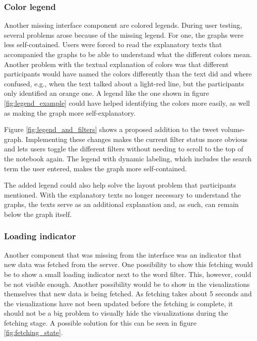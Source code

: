 \subsubsection*{Color legend}
Another missing interface component are colored legends. During user testing, several problems arose because of the missing legend. For one, the graphs were less self-contained. Users were forced to read the explanatory texts that accompanied the graphs to be able to understand what the different colors mean. Another problem with the textual explanation of colors was that different participants would have named the colors differently than the text did and where confused, e.g., when the text talked about a light-red line, but the participants only identified an orange one. A legend like the one shown in figure \ref{fig:legend_example} could have helped identifying the colors more easily, as well as making the graph more self-explanatory.

Figure \ref{fig:legend_and_filters} shows a proposed addition to the tweet volume-graph. Implementing these changes makes the current filter status more obvious and lets users toggle the different filters without needing to scroll to the top of the notebook again. The legend with dynamic labeling, which includes the search term the user entered, makes the graph more self-contained.

The added legend could also help solve the layout problem that participants mentioned. With the explanatory texts no longer necessary to understand the graphs, the texts serve as an additional explanation and, as such, can remain below the graph itself.

\subsubsection*{Loading indicator}
Another component that was missing from the interface was an indicator that new data was fetched from the server. One possibility to show this fetching would be to show a small loading indicator next to the word filter. This, however, could be not visible enough. Another possibility would be to show in the visualizations themselves that new data is being fetched. As fetching takes about 5 seconds and the visualizations have not been updated before the fetching is complete, it should not be a big problem to visually hide the visualizations during the fetching stage. A possible solution for this can be seen in figure \ref{fig:fetching_state}.

